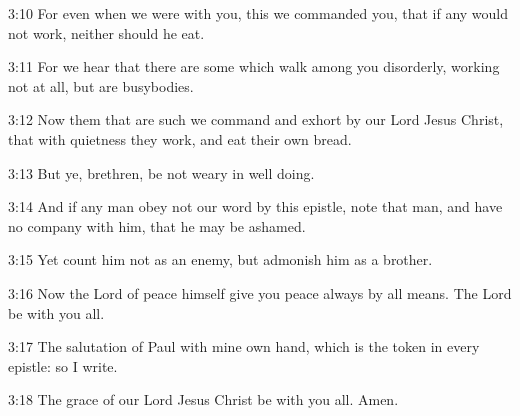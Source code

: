 3:10 For even when we were with you, this we commanded you, that if
any would not work, neither should he eat.

3:11 For we hear that there are some which walk among you disorderly,
working not at all, but are busybodies.

3:12 Now them that are such we command and exhort by our Lord Jesus
Christ, that with quietness they work, and eat their own bread.

3:13 But ye, brethren, be not weary in well doing.

3:14 And if any man obey not our word by this epistle, note that man,
and have no company with him, that he may be ashamed.

3:15 Yet count him not as an enemy, but admonish him as a brother.

3:16 Now the Lord of peace himself give you peace always by all means.
The Lord be with you all.

3:17 The salutation of Paul with mine own hand, which is the token in
every epistle: so I write.

3:18 The grace of our Lord Jesus Christ be with you all. Amen.

